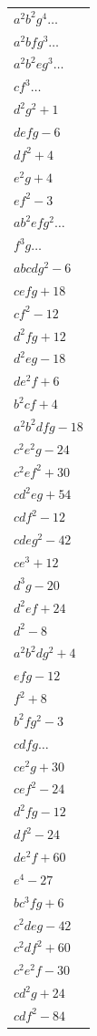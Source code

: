 \documentclass[11pt]{article}
\begin{document}
\begin{center}
\medskip
\begin{tabular}{|l|}
\hline
$a^{2}b^{2}g^{4}\ldots$\\
$a^{2}bfg^{3}\ldots$\\
$a^{2}b^{2}eg^{3}\ldots$\\
$cf^{3}\ldots$\\
$d^{2}g^{2}+1$\\
$defg-6$\\
$df^{2}+4$\\
$e^{2}g+4$\\
$ef^{2}-3$\\
$ab^{2}efg^{2}\ldots$\\
$f^{3}g\ldots$\\
$abcdg^{2}-6$\\
$cefg+18$\\
$cf^{2}-12$\\
$d^{2}fg+12$\\
$d^{2}eg-18$\\
$de^{2}f+6$\\
$b^{2}cf+4$\\
$a^{2}b^{2}dfg-18$\\
$c^{2}e^{2}g-24$\\
$c^{2}ef^{2}+30$\\
$cd^{2}eg+54$\\
$cdf^{2}-12$\\
$cdeg^{2}-42$\\
$ce^{3}+12$\\
$d^{3}g-20$\\
$d^{2}ef+24$\\
$d^{2}-8$\\
\hline
$a^{2}b^{2}dg^{2}+4$\\
$efg-12$\\
$f^{2}+8$\\
$b^{2}fg^{2}-3$\\
$cdfg\ldots$\\
$ce^{2}g+30$\\
$cef^{2}-24$\\
$d^{2}fg-12$\\
$df^{2}-24$\\
$de^{2}f+60$\\
$e^{4}-27$\\
$bc^{3}fg+6$\\
$c^{2}deg-42$\\
$c^{2}df^{2}+60$\\
$c^{2}e^{2}f-30$\\
$cd^{2}g+24$\\
$cdf^{2}-84$\\

\end{tabular}
\end{center}
\end{document}
